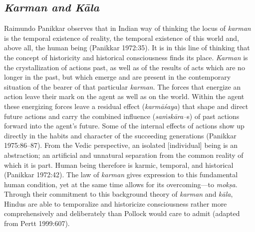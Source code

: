 \subsection*{\textit{Karman and Kāla}}

Raimundo Panikkar observes that in Indian way of thinking the locus of \textit{karman} is the temporal existence of reality, the temporal existence of this world and, above all, the human being (Panikkar 1972:35). It is in this line of thinking that the concept of historicity and historical consciousness finds its place. \textit{Karman} is the crystallization of actions past, as well as of the results of acts which are no longer in the past, but which emerge and are present in the contemporary situation of the bearer of that particular \textit{karman}. The forces that energize an action leave their mark on the agent as well as on the world. Within the agent these energizing forces leave a residual effect (\textit{karmāśaya}) that shape and direct future actions and carry the combined influence (\textit{saṁskāra–}s) of past actions forward into the agent's future. Some of the internal effects of actions show up directly in the habits and character of the succeeding generations (Panikkar 1975:86–87). From the Vedic perspective, an isolated [individual] being is an abstraction; an artificial and unnatural separation from the common reality of which it is part. Human being therefore is karmic, temporal, and historical (Panikkar 1972:42). The law of \textit{karman} gives expression to this fundamental human condition, yet at the same time allows for its overcoming—to \textit{mokṣa}. Through their commitment to this background theory of \textit{karman} and \textit{kāla}, Hindus are able to temporalize and historicize consciousness rather more comprehensively and deliberately than Pollock would care to admit (adapted from Pertt 1999:607).

